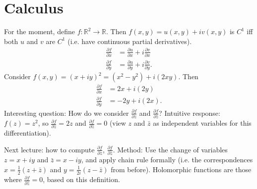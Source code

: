 \documentclass{artikel3}
\newcommand{\reals}{\mathbb{R}}
\newcommand{\complex}{\mathbb{R}}
\newcommand{\del}{\partial}
\begin{document}
\section{Calculus}
For the moment, define $f:\reals^2\to \complex$.  Then
$f(x,y)=u(x,y)+iv(x,y)$ is $C^1$ iff both $u$ and $v$ are $C^1$ (i.e.
have continuous partial derivatives).
\begin{align*}
	\frac{\del f}{\del x}&=\frac{\del u}{\del x}+i\frac{\del v}{\del x}\\
	\frac{\del f}{\del y}&=\frac{\del u}{\del y}+i\frac{\del v}{\del y}.
\end{align*}
Consider $f(x,y)=(x+iy)^2=(x^2-y^2)+i(2xy)$.  Then
\begin{align*}
	\frac{\del f}{\del x}&=2x+i(2y)\\
	\frac{\del f}{\del y}&=-2y+i(2x).
\end{align*}
Interesting question: How do we consider $\frac{\del f}{\del z}$
and $\frac{\del f}{\del \bar{z}}$?
Intuitive response: $f(z)=z^2$, so $\frac{\del f}{\del z}=2z$
and $\frac{\del f}{\del \bar{z}}=0$ (view $z$ and $\bar{z}$ as independent
variables for this differentiation).

Next lecture: how to compute $\frac{\del f}{\del z}$, $\frac{\del f}{\del \bar{z}}$.
Method: Use the change of variables $z=x+iy$ and $\bar{z}=x-iy$, and apply
chain rule formally (i.e. the correspondences
$x=\frac{1}{2}(z+\bar{z})$ and $y=\frac{1}{2i}(z-\bar{z})$ from before).
Holomorphic functions are those where $\frac{\del f}{\del \bar{z}}=0$,
based on this definition.
\label{lastpage}
\end{document}
